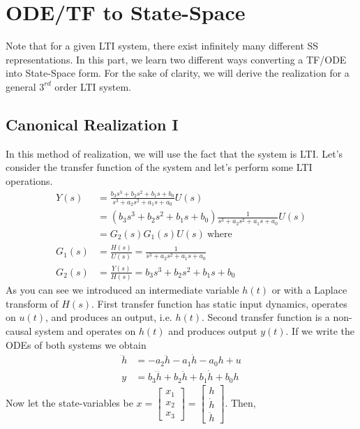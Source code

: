 \documentclass[twoside]{article}
\begin{document}
\section{ODE/TF to State-Space}

Note that for a given LTI system, there exist infinitely many 
different SS representations. In this part, we learn two different ways 
converting a TF/ODE into State-Space form. For the sake of clarity, 
we will derive the realization for a general $3^{rd}$ order LTI system.

\subsection{Canonical Realization I}

In this method of realization, we will use the fact that the system is
LTI. Let's consider the transfer function of the system and let's 
perform some LTI operations.
%
\begin{align*}
Y(s) &= \frac{ b_3 s^3 + b_2 s^2  + b_1 s + b_0 }{ s^3 + a_2 s^2 + a_1 s + a_0} U(s)
\\
&= \left( b_3 s^3 + b_2 s^2  + b_1 s + b_0 \right)  
\frac{1}{ s^3 + a_2 s^2 + a_1 s + a_0 } U(s) 
\\
&= G_2(s) G_1(s) U(s) \ \mathrm{where} 
\\
G_1(s) &= \frac{H(s)}{U(s)} = \frac{1}{ s^3 + a_2 s^2 + a_1 s + a_0 } 
\\
G_2(s) &= \frac{Y(s)}{H(s)} = b_3 s^3 + b_2 s^2  + b_1 s + b_0
\end{align*}
%
As you can see we introduced an intermediate variable $h(t)$ or with a
Laplace transform of $H(s)$. First transfer function has static input
dynamics, operates on $u(t)$, and produces an output, i.e. $h(t)$. 
Second transfer function is a non-causal system and operates on $h(t)$ and produces output
$y(t)$. If we write the ODEs of both systems we obtain
%
\begin{align*}
\dddot{h} &= -a_2 \ddot{h} - a_1 \dot{h} - a_0 h + u
\\
y &= b_3 \dddot{h} + b_2 \ddot{h} + b_1 \dot{h} + b_0 h
\end{align*}
%
Now let the state-variables be 
$x = \left[ \begin{array}{c} x_1 \\ x_2 \\ x_3 \end{array} \right] 
= \left[ \begin{array}{c} h \\ \dot{h} \\ \ddot{h} \end{array} \right]$. Then,
\end{document}
